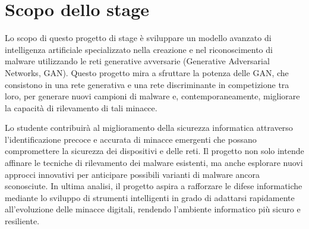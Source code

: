\section{Scopo dello stage}
Lo scopo di questo progetto di stage è sviluppare un modello avanzato di intelligenza artificiale specializzato nella creazione e nel riconoscimento di malware utilizzando le reti generative avversarie (Generative Adversarial Networks, GAN). Questo progetto mira a sfruttare la potenza delle GAN, che consistono in una rete generativa e una rete discriminante in competizione tra loro, per generare nuovi campioni di malware e, contemporaneamente, migliorare la capacità di rilevamento di tali minacce.
\begin{flushleft}
Lo studente contribuirà al miglioramento della sicurezza informatica attraverso l'identificazione precoce e accurata di minacce emergenti che possano compromettere la sicurezza dei dispositivi e delle reti. Il progetto non solo intende affinare le tecniche di rilevamento dei malware esistenti, ma anche esplorare nuovi approcci innovativi per anticipare possibili varianti di malware ancora sconosciute. In ultima analisi, il progetto aspira a rafforzare le difese informatiche mediante lo sviluppo di strumenti intelligenti in grado di adattarsi rapidamente all'evoluzione delle minacce digitali, rendendo l'ambiente informatico più sicuro e resiliente.
\end{flushleft}